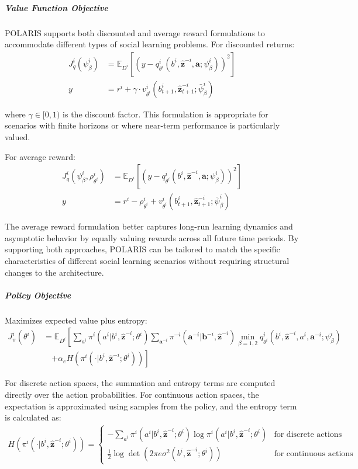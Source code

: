 \subparagraph{Value Function Objective} POLARIS supports both discounted and average reward formulations to accommodate different types of social learning problems. For discounted returns:
\begin{align}
    J^i_q(\psi^i_{\beta}) &= \mathbb{E}_{D^i}\left[(y - q^i_{\theta^i}(b^i, \boldsymbol{\hat{z}}^{-i}, \boldsymbol{a}; \psi^i_{\beta}))^2\right] \\
    y &= r^i + \gamma \cdot v^i_{\theta^i}(b^i_{t+1}, \boldsymbol{\hat{z}}^{-i}_{t+1}; \bar{\psi}^i_{\beta})
\end{align}

where $\gamma \in [0, 1)$ is the discount factor. This formulation is appropriate for scenarios with finite horizons or where near-term performance is particularly valued.

For average reward:
\begin{align}
    J^i_q(\psi^i_{\beta}, \rho^i_{\theta^i}) &= \mathbb{E}_{D^i}\left[(y - q^i_{\theta^i}(b^i, \boldsymbol{\hat{z}}^{-i}, \boldsymbol{a}; \psi^i_{\beta}))^2\right] \\
    y &= r^i - \rho^i_{\theta^i} + v^i_{\theta^i}(b^i_{t+1}, \boldsymbol{\hat{z}}^{-i}_{t+1}; \bar{\psi}^i_{\beta})
\end{align}

The average reward formulation better captures long-run learning dynamics and asymptotic behavior by equally valuing rewards across all future time periods. By supporting both approaches, POLARIS can be tailored to match the specific characteristics of different social learning scenarios without requiring structural changes to the architecture.

\subparagraph{Policy Objective} Maximizes expected value plus entropy:
\begin{align}
    J^i_{\pi}(\theta^i) &= \mathbb{E}_{D^i}\left[\sum_{a^i} \pi^i(a^i|b^i, \boldsymbol{\hat{z}}^{-i}; \theta^i) \sum_{\boldsymbol{a}^{-i}} \pi^{-i}(\boldsymbol{a}^{-i}|\boldsymbol{b}^{-i}, \boldsymbol{\hat{z}}^{-i}) \min_{\beta=1,2} q^i_{\theta^i}(b^i, \boldsymbol{\hat{z}}^{-i}, a^i, \boldsymbol{a}^{-i}; \psi^i_{\beta}) \right. \\
    & \quad \left. + \alpha_e H(\pi^i(\cdot|b^i, \boldsymbol{\hat{z}}^{-i}; \theta^i))\right]
\end{align}

For discrete action spaces, the summation and entropy terms are computed directly over the action probabilities. For continuous action spaces, the expectation is approximated using samples from the policy, and the entropy term is calculated as:
\begin{align}
    H(\pi^i(\cdot|b^i, \boldsymbol{\hat{z}}^{-i}; \theta^i)) = 
    \begin{cases}
        -\sum_{a^i} \pi^i(a^i|b^i, \boldsymbol{\hat{z}}^{-i}; \theta^i) \log \pi^i(a^i|b^i, \boldsymbol{\hat{z}}^{-i}; \theta^i) & \text{for discrete actions} \\
        \frac{1}{2}\log\det(2\pi e \sigma^2(b^i, \boldsymbol{\hat{z}}^{-i}; \theta^i)) & \text{for continuous actions}
    \end{cases}
\end{align}

